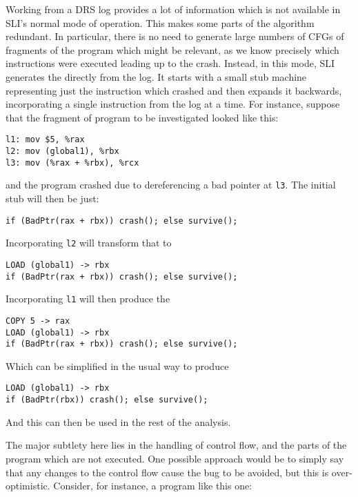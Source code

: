 Working from a DRS log provides a lot of information which is not available in SLI's normal mode of operation.
This makes some parts of the algorithm redundant.
In particular, there is no need to generate large numbers of CFGs of fragments of the program which might be relevant, as we know precisely which instructions were executed leading up to the crash.
Instead, in this mode, SLI generates the \StateMachine directly from the log.
It starts with a small stub machine representing just the instruction which crashed and then expands it backwards, incorporating a single instruction from the log at a time.
For instance, suppose that the fragment of program to be investigated looked like this:

\begin{verbatim}
l1: mov $5, %rax
l2: mov (global1), %rbx
l3: mov (%rax + %rbx), %rcx
\end{verbatim}

and the program crashed due to dereferencing a bad pointer at \verb|l3|.
The initial stub \StateMachine will then be just:

\begin{verbatim}
if (BadPtr(rax + rbx)) crash(); else survive();
\end{verbatim}

Incorporating \verb|l2| will transform that to

\begin{verbatim}
LOAD (global1) -> rbx
if (BadPtr(rax + rbx)) crash(); else survive();
\end{verbatim}

Incorporating \verb|l1| will then produce the \StateMachine

\begin{verbatim}
COPY 5 -> rax
LOAD (global1) -> rbx
if (BadPtr(rax + rbx)) crash(); else survive();
\end{verbatim}

Which can be simplified in the usual way to produce

\begin{verbatim}
LOAD (global1) -> rbx
if (BadPtr(rbx)) crash(); else survive();
\end{verbatim}

And this can then be used in the rest of the analysis.

The major subtlety here lies in the handling of control flow, and the parts of the program which are not executed.
One possible approach would be to simply say that any changes to the control flow cause the bug to be avoided, but this is over-optimistic.
Consider, for instance, a program like this one:

